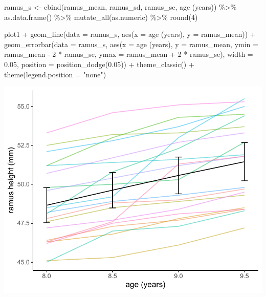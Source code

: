 \documentclass[
  9pt,
  ignorenonframetext,
]{beamer}
\newenvironment{Shaded}{\begin{snugshade}}{\end{snugshade}}
\newcommand{\AttributeTok}[1]{\textcolor[rgb]{0.77,0.63,0.00}{#1}}
\newcommand{\DecValTok}[1]{\textcolor[rgb]{0.00,0.00,0.81}{#1}}
\newcommand{\FloatTok}[1]{\textcolor[rgb]{0.00,0.00,0.81}{#1}}
\newcommand{\FunctionTok}[1]{\textcolor[rgb]{0.00,0.00,0.00}{#1}}
\newcommand{\NormalTok}[1]{#1}
\newcommand{\OtherTok}[1]{\textcolor[rgb]{0.56,0.35,0.01}{#1}}
\newcommand{\SpecialCharTok}[1]{\textcolor[rgb]{0.00,0.00,0.00}{#1}}
\newcommand{\StringTok}[1]{\textcolor[rgb]{0.31,0.60,0.02}{#1}}
\begin{document}
\begin{frame}[fragile]{}
\protect\hypertarget{section-3}{}
\tiny

\begin{Shaded}
\begin{Highlighting}[]
\NormalTok{ramus\_s }\OtherTok{\textless{}{-}} 
  \FunctionTok{cbind}\NormalTok{(ramus\_mean, ramus\_sd, }
\NormalTok{        ramus\_se, }\StringTok{\textasciigrave{}}\AttributeTok{age (years)}\StringTok{\textasciigrave{}}\NormalTok{) }\SpecialCharTok{\%\textgreater{}\%}
  \FunctionTok{as.data.frame}\NormalTok{() }\SpecialCharTok{\%\textgreater{}\%}
  \FunctionTok{mutate\_all}\NormalTok{(as.numeric) }\SpecialCharTok{\%\textgreater{}\%}
  \FunctionTok{round}\NormalTok{(}\DecValTok{4}\NormalTok{) }

\NormalTok{plot1 }\SpecialCharTok{+} 
  \FunctionTok{geom\_line}\NormalTok{(}\AttributeTok{data =}\NormalTok{ ramus\_s, }
            \FunctionTok{aes}\NormalTok{(}\AttributeTok{x =} \StringTok{\textasciigrave{}}\AttributeTok{age (years)}\StringTok{\textasciigrave{}}\NormalTok{, }
                \AttributeTok{y =}\NormalTok{ ramus\_mean)) }\SpecialCharTok{+}
  \FunctionTok{geom\_errorbar}\NormalTok{(}\AttributeTok{data =}\NormalTok{ ramus\_s,}
                \FunctionTok{aes}\NormalTok{(}\AttributeTok{x =} \StringTok{\textasciigrave{}}\AttributeTok{age (years)}\StringTok{\textasciigrave{}}\NormalTok{, }\AttributeTok{y =}\NormalTok{ ramus\_mean,}
                    \AttributeTok{ymin =}\NormalTok{ ramus\_mean }\SpecialCharTok{{-}} \DecValTok{2} \SpecialCharTok{*}\NormalTok{ ramus\_se,}
                    \AttributeTok{ymax =}\NormalTok{ ramus\_mean }\SpecialCharTok{+} \DecValTok{2} \SpecialCharTok{*}\NormalTok{ ramus\_se),}
                \AttributeTok{width =} \FloatTok{0.05}\NormalTok{,  }
                \AttributeTok{position =} \FunctionTok{position\_dodge}\NormalTok{(}\FloatTok{0.05}\NormalTok{)) }\SpecialCharTok{+}
  \FunctionTok{theme\_classic}\NormalTok{() }\SpecialCharTok{+}
  \FunctionTok{theme}\NormalTok{(}\AttributeTok{legend.position =} \StringTok{"none"}\NormalTok{) }
\end{Highlighting}
\end{Shaded}

\begin{center}\includegraphics[width=0.6\linewidth]{figs_L2/unnamed-chunk-6-1} \end{center}

\tiny
\end{frame}
\end{document}
